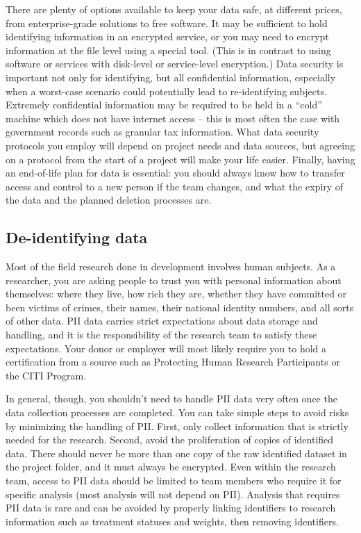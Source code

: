 There are plenty of options available to keep your data safe,
at different prices, from enterprise-grade solutions to free software.
It may be sufficient to hold identifying information in an encrypted service,
or you may need to encrypt information at the file level using a special tool.
(This is in contrast to using software or services with disk-level or service-level encryption.)
Data security is important not only for identifying, but all confidential information,
especially when a worst-case scenario could potentially lead to re-identifying subjects.
Extremely confidential information may be required to be held in a ``cold'' machine
which does not have internet access -- this is most often the case with
government records such as granular tax information.
What data security protocols you employ will depend on project needs and data sources,
but agreeing on a protocol from the start of a project will make your life easier.
Finally, having an end-of-life plan for data is essential:
you should always know how to transfer access and control to a new person if the team changes,
and what the expiry of the data and the planned deletion processes are.

\subsection{De-identifying data}

Most of the field research done in development involves human subjects.
As a researcher, you are asking people to trust you with personal information about themselves:
where they live, how rich they are, whether they have committed or been victims of crimes,
their names, their national identity numbers, and all sorts of other data.
PII data carries strict expectations about data storage and handling,
and it is the responsibility of the research team to satisfy these expectations.
Your donor or employer will most likely require you to hold a certification from a source
such as Protecting Human Research Participants
or the CITI Program.

In general, though, you shouldn't need to handle PII data very often
once the data collection processes are completed.
You can take simple steps to avoid risks by minimizing the handling of PII.
First, only collect information that is strictly needed for the research.
Second, avoid the proliferation of copies of identified data.
There should never be more than one copy of the raw identified dataset in the project folder, 
and it must always be encrypted.
Even within the research team, 
access to PII data should be limited to team members who require it for specific analysis 
(most analysis will not depend on PII).
Analysis that requires PII data is rare
and can be avoided by properly linking identifiers to research information
such as treatment statuses and weights, then removing identifiers.

